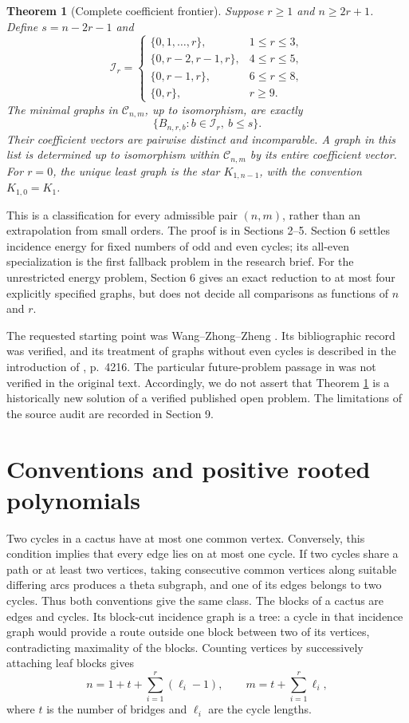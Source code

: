 \documentclass[12pt]{amsart}
\newtheorem{thm}{Theorem}[section]
\theoremstyle{definition}
\theoremstyle{remark}
\numberwithin{equation}{section}
\begin{document}
\begin{thm}[Complete coefficient frontier]\label{en:frontier}
Suppose $r\ge1$ and $n\ge2r+1$. Define $s=n-2r-1$ and
\[
 \mathcal I_r=
 \begin{cases}
 \{0,1,\ldots,r\},&1\le r\le3,\\
 \{0,r-2,r-1,r\},&4\le r\le5,\\
 \{0,r-1,r\},&6\le r\le8,\\
 \{0,r\},&r\ge9.
 \end{cases}
\]
The minimal graphs in $\mathcal C_{n,m}$, up to isomorphism, are exactly
\[
 \bigl\{B_{n,r,b}:b\in\mathcal I_r,\ b\le s\bigr\}.
\]
Their coefficient vectors are pairwise distinct and incomparable. A graph
in this list is determined up to isomorphism within $\mathcal C_{n,m}$ by
its entire coefficient vector. For $r=0$, the unique least graph is the star
$K_{1,n-1}$, with the convention $K_{1,0}=K_1$.
\end{thm}

This is a classification for every admissible pair $(n,m)$, rather than an
extrapolation from small orders. The proof is in Sections 2--5. Section 6
settles incidence energy for fixed numbers of odd and even cycles; its
all-even specialization is the first fallback problem in the research brief.
For the unrestricted energy problem, Section 6 gives an exact reduction to
at most four explicitly specified graphs, but does not decide all comparisons
as functions of $n$ and $r$.

The requested starting point was Wang--Zhong--Zheng \cite{en-wzz}.
Its bibliographic record was verified, and its treatment of graphs without
even cycles is described in the introduction of \cite{en-zw}, p.~4216.
The particular future-problem passage in \cite{en-wzz} was not verified in
the original text. Accordingly, we do not assert that Theorem
\ref{en:frontier} is a historically new solution of a verified published
open problem. The limitations of the source audit are recorded in Section 9.

\section{Conventions and positive rooted polynomials}
Two cycles in a cactus have at most one common vertex. Conversely, this
condition implies that every edge lies on at most one cycle. If two cycles
share a path or at least two vertices, taking consecutive common vertices
along suitable differing arcs produces a theta subgraph, and one of its
edges belongs to two cycles. Thus both conventions give the same class.
The blocks of a cactus are edges and cycles. Its block-cut incidence graph
is a tree: a cycle in that incidence graph would provide a route outside
one block between two of its vertices, contradicting maximality of the
blocks. Counting vertices by successively attaching leaf blocks gives
\begin{equation}\label{en:count}
 n=1+t+\sum_{i=1}^r(\ell_i-1),\qquad
 m=t+\sum_{i=1}^r\ell_i,
\end{equation}
where $t$ is the number of bridges and $\ell_i$ are the cycle lengths.
\end{document}
